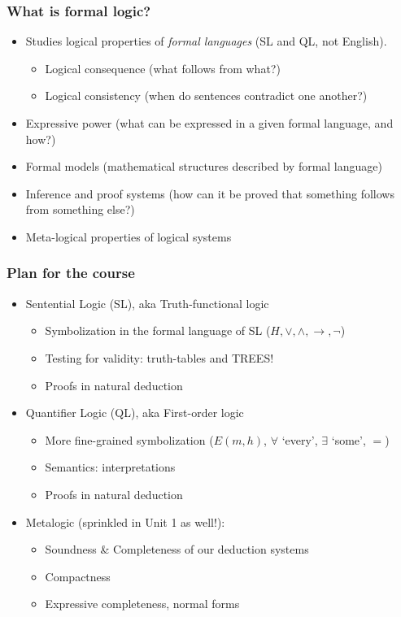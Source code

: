\begin{frame}
  \frametitle{What is formal logic?}

  \begin{itemize}[<+->]
  \item Studies logical properties of \emph{formal languages} (SL and
  QL, not English).
    \begin{itemize}[<+->]
    \item Logical consequence (what follows from what?)
    \item Logical consistency (when do sentences contradict one another?)
    \end{itemize}
  \item Expressive power (what can be expressed in a given formal
  language, and how?)
  \item Formal models (mathematical structures described by formal language)
  \item Inference and proof systems (how can it be proved that something
  follows from something else?)
  \item Meta-logical properties of logical systems
  \end{itemize}
\end{frame}

\begin{frame}
  \frametitle{Plan for the course}

  \begin{itemize}[<+->]
  \item Sentential Logic (SL), aka Truth-functional logic
    \begin{itemize}[<+->]
    \item Symbolization in the formal language of SL ($H, \lor,
    \land, \to, \lnot$)
    \item Testing for validity: truth-tables and TREES! 
    \item Proofs in natural deduction
    \end{itemize}
  \item Quantifier Logic (QL), aka First-order logic 
    \begin{itemize}[<+->]
    \item More fine-grained symbolization ($E(m,h)$, $\forall$
    `every', $\exists$ `some', $=$)
    \item Semantics: interpretations
    \item Proofs in natural deduction
    \end{itemize}
  \item Metalogic (sprinkled in Unit 1 as well!): 
 \begin{itemize}[<+->]
\item Soundness \& Completeness of our deduction systems
\item Compactness
\item Expressive completeness, normal forms
  \end{itemize}
  \end{itemize}
\end{frame}

